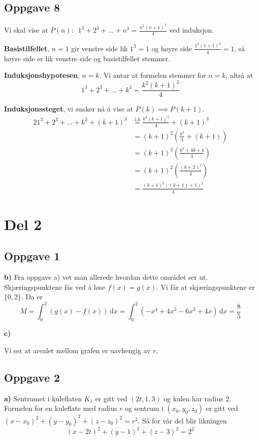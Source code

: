 \subsection{Oppgave 8}
Vi skal vise at $P(n): \enspace1^3+2^3+\dots+n^3=\frac{n^2(n+1)^2}{4}$ ved induksjon. \newline

\textbf{Basistilfellet}, $n=1$ gir venstre side lik $1^3=1$ og høyre side $\frac{1^2(1+1)^2}{4}=1$, så høyre side er lik venstre side og basistilfellet stemmer. \newline

\textbf{Induksjonshypotesen}, $n=k$. Vi antar at formelen stemmer for $n=k$, altså at $$1^3+2^3+\dots+k^3 = \frac{k^2(k+1)^2}{4}$$ 

\textbf{Induksjonssteget}, vi ønsker nå å vise at $P(k)\implies P(k+1)$. 
\begin{alignat*}{2}
	1^3+2^3+\dots+k^3+(k+1)^3 &\overset{\text{i.h}}{=} \frac{k^2(k+1)^2}{4} + (k+1)^3 \\
	&= (k+1)^2\left(\frac{k^2}{4} + (k+1)\right) \\
	&= (k+1)^2 \left(\frac{k^2+4k+4}{4}\right) \\
	&= (k+1)^2 \left(\frac{(k+2)^2}{4}\right) \\
	&= \frac{(k+1)^2((k+1)+1)^2}{4}
\end{alignat*}
\newpage
\section{Del 2}
\subsection{Oppgave 1}
\textbf{b)} Fra oppgave a) vet man allerede hvordan dette området ser ut. Skjæringspunktene fås ved å løse $f(x)=g(x)$. Vi får at skjæringspunktene er $\{0,2\}$. Da er $$M=\int_0^2 (g(x)-f(x)) \, \text{d}x = \int_0^2 (-x^4+4x^3-6x^2+4x) \, \text{d}x = \frac85$$

\textbf{c)} \\
\begin{figure}[ht]
	\centering
\end{figure}
Vi ser at arealet mellom grafen er uavhengig av $r$.

\subsection{Oppgave 2}
\textbf{a)} Sentrumet i kuleflaten $K_1$ er gitt ved $(2t,1,3)$ og kulen har radius $2$. Formelen for en kuleflate med radius $r$ og sentrum i $(x_0,y_0,z_0)$ er gitt ved $(x-x_0)^2+(y-y_0)^2+(z-z_0)^2=r^2$. Så for vår del blir likningen $$(x-2t)^2+(y-1)^2+(z-3)^2=2^2$$ 

